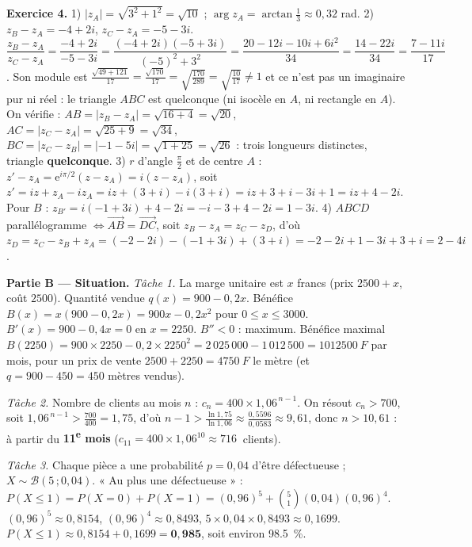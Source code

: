 \noindent\textbf{Exercice 4.}
1) $|z_A|=\sqrt{3^2+1^2}=\sqrt{10}$ ; $\arg z_A=\arctan\frac13\approx0{,}32$ rad.
2) $z_B-z_A=-4+2i$, $z_C-z_A=-5-3i$.
$\dfrac{z_B-z_A}{z_C-z_A}=\dfrac{-4+2i}{-5-3i}=\dfrac{(-4+2i)(-5+3i)}{(-5)^2+3^2}=\dfrac{20-12i-10i+6i^2}{34}=\dfrac{14-22i}{34}=\dfrac{7-11i}{17}$.
Son module est $\frac{\sqrt{49+121}}{17}=\frac{\sqrt{170}}{17}=\sqrt{\frac{170}{289}}=\sqrt{\frac{10}{17}}\neq1$
et ce n'est pas un imaginaire pur ni réel : le triangle $ABC$ est quelconque (ni isocèle en $A$, ni rectangle en $A$).
On vérifie : $AB=|z_B-z_A|=\sqrt{16+4}=\sqrt{20}$, $AC=|z_C-z_A|=\sqrt{25+9}=\sqrt{34}$,
$BC=|z_C-z_B|=|-1-5i|=\sqrt{1+25}=\sqrt{26}$ : trois longueurs distinctes, triangle \textbf{quelconque}.
3) $r$ d'angle $\frac\pi2$ et de centre $A$ : $z'-z_A=\mathrm e^{i\pi/2}(z-z_A)=i(z-z_A)$, soit
$z'=i z+z_A-i z_A=iz+(3+i)-i(3+i)=iz+3+i-3i+1=iz+4-2i$.
Pour $B$ : $z_{B'}=i(-1+3i)+4-2i=-i-3+4-2i=1-3i$.
4) $ABCD$ parallélogramme $\iff \vec{AB}=\vec{DC}$, soit $z_B-z_A=z_C-z_D$, d'où
$z_D=z_C-z_B+z_A=(-2-2i)-(-1+3i)+(3+i)=-2-2i+1-3i+3+i=2-4i$.

\smallskip
\noindent\textbf{Partie B — Situation.}
\emph{Tâche 1.} La marge unitaire est $x$ francs (prix $2500+x$, coût $2500$). Quantité vendue
$q(x)=900-0{,}2x$. Bénéfice $B(x)=x(900-0{,}2x)=900x-0{,}2x^2$ pour $0\le x\le3000$.
$B'(x)=900-0{,}4x=0$ en $x=2250$. $B''<0$ : maximum. Bénéfice maximal
$B(2250)=900\times2250-0{,}2\times2250^2=2\,025\,000-1\,012\,500=\SI{1012500}{F}$ par mois,
pour un prix de vente $2500+2250=\SI{4750}{F}$ le mètre (et $q=900-450=450$ mètres vendus).

\emph{Tâche 2.} Nombre de clients au mois $n$ : $c_n=400\times1{,}06^{\,n-1}$. On résout $c_n>700$,
soit $1{,}06^{\,n-1}>\frac{700}{400}=1{,}75$, d'où $n-1>\frac{\ln1{,}75}{\ln1{,}06}\approx\frac{0{,}5596}{0{,}0583}\approx9{,}61$,
donc $n>10{,}61$ : à partir du \textbf{11\textsuperscript{e} mois} ($c_{11}=400\times1{,}06^{10}\approx\SI{716}{}$ clients).

\emph{Tâche 3.} Chaque pièce a une probabilité $p=0{,}04$ d'être défectueuse ; $X\sim\mathcal B(5\,;0{,}04)$.
« Au plus une défectueuse » : $P(X\le1)=P(X{=}0)+P(X{=}1)=(0{,}96)^5+\binom51(0{,}04)(0{,}96)^4$.
$(0{,}96)^5\approx0{,}8154$, $(0{,}96)^4\approx0{,}8493$, $5\times0{,}04\times0{,}8493\approx0{,}1699$.
$P(X\le1)\approx0{,}8154+0{,}1699=\mathbf{0{,}985}$, soit environ \SI{98,5}{\percent}.
